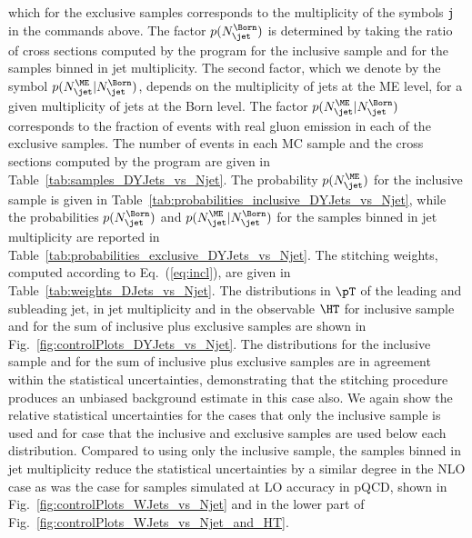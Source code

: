 which for the exclusive samples corresponds to the multiplicity of the symbols \texttt{j} in the \MGvATNLO commands above.
The factor $p(N_{\jet}^{\Born})$ is determined by taking the ratio of cross sections computed by the program \MGvATNLO 
for the inclusive sample and for the samples binned in jet multiplicity.
The second factor, which we denote by the symbol $p(N_{\jet}^{\ME} \vert N_{\jet}^{\Born})$, depends on the multiplicity of jets at the ME level,
for a given multiplicity of jets at the Born level.
The factor $p(N_{\jet}^{\ME} \vert N_{\jet}^{\Born})$ corresponds to the fraction of events with real gluon emission in each of the exclusive samples.
The number of events in each MC sample and the cross sections computed by the program \MGvATNLO are given in Table~\ref{tab:samples_DYJets_vs_Njet}.
The probability $p(N_{\jet}^{\ME})$ for the inclusive sample is given in Table~\ref{tab:probabilities_inclusive_DYJets_vs_Njet},
while the probabilities $p(N_{\jet}^{\Born})$ and $p(N_{\jet}^{\ME} \vert N_{\jet}^{\Born})$ for the samples binned in jet multiplicity are reported in Table~\ref{tab:probabilities_exclusive_DYJets_vs_Njet}.
The stitching weights, computed according to Eq.~(\ref{eq:incl}), are given in Table~\ref{tab:weights_DJets_vs_Njet}.
The distributions in $\pT$ of the leading and subleading jet,
in jet multiplicity and in the observable $\HT$ 
for inclusive sample and for the sum of inclusive plus exclusive samples are shown in Fig.~\ref{fig:controlPlots_DYJets_vs_Njet}.
The distributions for the inclusive sample and for the sum of inclusive plus exclusive samples are in agreement within the statistical uncertainties,
demonstrating that the stitching procedure produces an unbiased background estimate in this case also.
We again show the relative statistical uncertainties for the cases that only the inclusive sample is used
and for case that the inclusive and exclusive samples are used below each distribution.
Compared to using only the inclusive sample,
the samples binned in jet multiplicity reduce the statistical uncertainties by a similar degree in the NLO case
as was the case for samples simulated at LO accuracy in pQCD, 
shown in Fig.~\ref{fig:controlPlots_WJets_vs_Njet} and in the lower part of Fig.~\ref{fig:controlPlots_WJets_vs_Njet_and_HT}.

